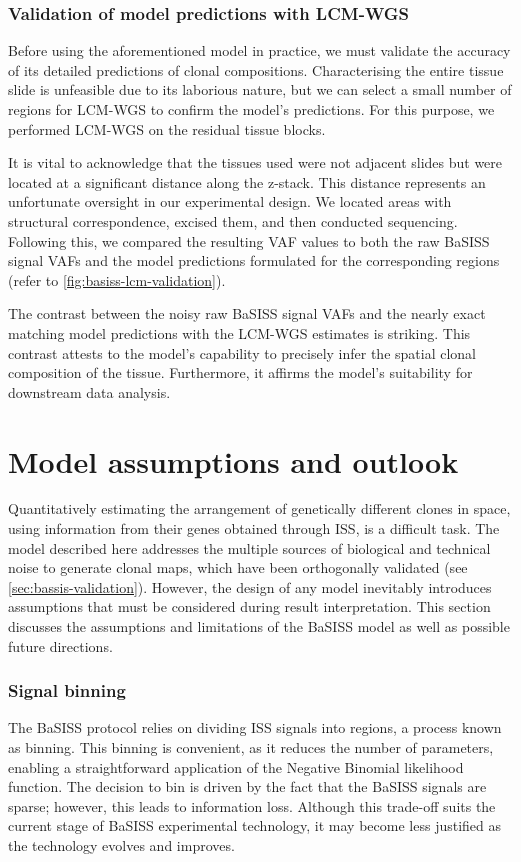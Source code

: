 \subsubsection*{Validation of model predictions with \ac{LCM}-\ac{WGS}}
Before using the aforementioned model in practice, we must validate the accuracy of its detailed predictions of clonal compositions. Characterising the entire tissue slide is unfeasible due to its laborious nature, but we can select a small number of regions for \ac{LCM}-\ac{WGS} to confirm the model's predictions. For this purpose, we performed \ac{LCM}-\ac{WGS} on the residual tissue blocks.

It is vital to acknowledge that the tissues used were not adjacent slides but were located at a significant distance along the z-stack. This distance represents an unfortunate oversight in our experimental design. We located areas with structural correspondence, excised them, and then conducted sequencing. Following this, we compared the resulting \ac{VAF} values to both the raw \ac{BaSISS} signal \ac{VAF}s and the model predictions formulated for the corresponding regions (refer to \cref{fig:basiss-lcm-validation}).

The contrast between the noisy raw \ac{BaSISS} signal VAFs and the nearly exact matching model predictions with the \ac{LCM}-\ac{WGS} estimates is striking. This contrast attests to the model's capability to precisely infer the spatial clonal composition of the tissue. Furthermore, it affirms the model's suitability for downstream data analysis.

\section{Model assumptions and outlook}
\label{sec:basiss-model-assumptions}

Quantitatively estimating the arrangement of genetically different clones in space, using information from their genes obtained through \ac{ISS}, is a difficult task. The model described here addresses the multiple sources of biological and technical noise to generate clonal maps, which have been orthogonally validated (see \cref{sec:bassis-validation}). However, the design of any model inevitably introduces assumptions that must be considered during result interpretation. This section discusses the assumptions and limitations of the \ac{BaSISS} model as well as possible future directions.

\subsubsection*{Signal binning}
The \ac{BaSISS} protocol relies on dividing \ac{ISS} signals into regions, a process known as binning. This binning is convenient, as it reduces the number of parameters, enabling a straightforward application of the Negative Binomial likelihood function. The decision to bin is driven by the fact that the \ac{BaSISS} signals are sparse; however, this leads to information loss. Although this trade-off suits the current stage of \ac{BaSISS} experimental technology, it may become less justified as the technology evolves and improves.

